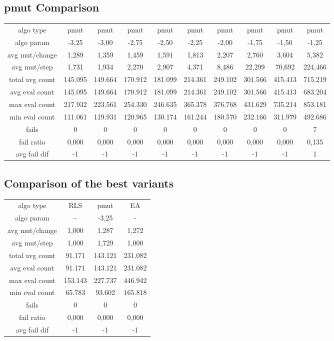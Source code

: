 \subsection{pmut Comparison}
\begin{tabular}[h]{cccccccccc}
algo type&           pmut&    pmut&    pmut&    pmut&    pmut&    pmut&    pmut&    pmut&    pmut\\
algo param&         -3,25&   -3,00&   -2,75&   -2,50&   -2,25&   -2,00&   -1,75&   -1,50&   -1,25\\
avg mut/change&     1,289&   1,359&   1,459&   1,591&   1,813&   2,207&   2,760&   3,604&   5,382\\
avg mut/step&       1,731&   1,934&   2,270&   2,907&   4,371&   8,486&  22,299&  70,692& 224,466\\
\hline
total avg count&  145.095& 149.664& 170.912& 181.099& 214.361& 249.102& 301.566& 415.413& 715.219\\
avg eval count&   145.095& 149.664& 170.912& 181.099& 214.361& 249.102& 301.566& 415.413& 683.204\\
max eval count&   217.932& 223.561& 254.330& 246.635& 365.378& 376.768& 431.629& 735.214& 853.181\\
min eval count&   111.061& 119.931& 120.965& 130.174& 161.244& 180.570& 232.166& 311.979& 492.686\\
\hline
fails&                  0&       0&       0&       0&       0&       0&       0&       0&       7\\
fail ratio&         0,000&   0,000&   0,000&   0,000&   0,000&   0,000&   0,000&   0,000&   0,135\\
avg fail dif&          -1&      -1&      -1&      -1&      -1&      -1&      -1&      -1&       1\\
\end{tabular}
\subsection{Comparison of the best variants}
\begin{tabular}[h]{cccc}
algo type&            RLS&    pmut&      EA\\
algo param&             -&   -3,25&       -\\
avg mut/change&     1,000&   1,287&   1,272\\
avg mut/step&       1,000&   1,729&   1,000\\
\hline
total avg count&   91.171& 143.121& 231.082\\
avg eval count&    91.171& 143.121& 231.082\\
max eval count&   153.143& 227.737& 446.942\\
min eval count&    65.783&  93.602& 165.818\\
\hline
fails&                  0&       0&       0\\
fail ratio&         0,000&   0,000&   0,000\\
avg fail dif&          -1&      -1&      -1\\
\end{tabular}
